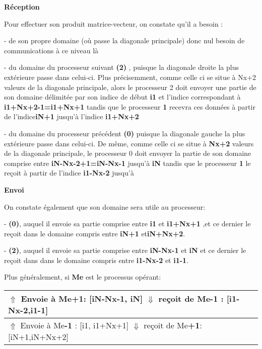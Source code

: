 \documentclass[a4paper,12pt,twoside]{report}
\begin{document}
\textbf{Réception}

Pour effectuer son produit matrice-vecteur, on constate qu'il a besoin :

- de son propre domaine (où passe la diagonale principale) donc nul besoin de communications à ce niveau là

- du domaine du processeur suivant \textbf{ (2)} , puisque la diagonale droite la plus extérieure passe dans celui-ci. Plus précisemment, comme celle ci se situe à Nx+2 valeurs de la diagonale principale, alors le processeur 2 doit envoyer une partie de son domaine délimitée par son indice de début\textbf{ i1} et l'indice correspondant à \textbf{i1+Nx+2-1=i1+Nx+1} tandis que le processeur \textbf{{\color{Azure4}1}} recevra ces données à partir de l'indice\textbf{ {\color{Azure4}iN+1}} jusqu'à l'indice \textbf{ {\color{Azure4}i1+Nx+2}}

- du domaine du processeur précédent \textbf{{\color{teal}(0)}} puisque la diagonale gauche la plus extérieure  passe dans celui-ci. De même, comme celle ci se situe à \textbf{Nx+2 }valeurs de la diagonale principale, le processeur 0 doit envoyer la partie de son domaine  comprise entre \textbf{{\color{teal}iN-Nx-2+1=iN-Nx-1}}      jusqu'à \textbf{{\color{teal}iN}}  
 tandis que le processeur \textbf{ {\color{Azure4}1}} le reçoit à partir de l'indice\textbf{ {\color{Azure4} i1-Nx-2} }jusqu'à\textbf{ {\color{Azure4}{ i1-1.}}}



\textbf{Envoi}

On constate également que son domaine sera utile au processeur:

- \textbf{{\color{teal}(0)}}, auquel il envoie sa partie comprise entre \textbf{{\color{Azure4}i1}} et \textbf{{\color{Azure4}i1+Nx+1 }},et ce dernier le reçoit dans le domaine compris entre\textbf{ {\color{teal} iN+1}} et\textbf{ {\color{teal}iN+Nx+2}}.

- \textbf{(2)}, auquel il envoie sa partie comprise entre {\color{Azure4}\textbf{iN-Nx-1} } et {\color{Azure4}\textbf{iN}} et ce dernier le reçoit dans dans le domaine compris entre \textbf{i1-Nx-2}  et\textbf{ i1-1}.





Plus généralement, si \textbf{Me} est le processus opérant:

\begin{tabular}{|l|}
  \hline
  $\Uparrow$ Envoie à Me\textbf{+1}:  	[iN-Nx-1, iN]
  $\Downarrow $ reçoit de Me\textbf{{\color{teal}-1}} : [i1-Nx-2,i1-1] \\
  \hline
  $\Uparrow$ Envoie à Me\textbf{{\color{teal}-1} } :  [i1, i1+Nx+1] $\Downarrow$ reçoit de Me\textbf{+1}: [iN+1,iN+Nx+2] \\
 
  \hline
\end{tabular}
\end{document}
